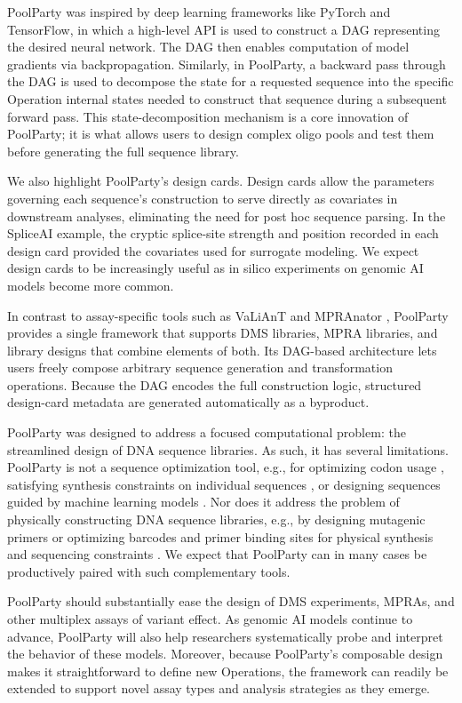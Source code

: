 \documentclass[twoside]{kinneylab_preprintstyle}
\begin{document}
PoolParty was inspired by deep learning frameworks like PyTorch and TensorFlow, in which a high-level API is used to construct a DAG representing the desired neural network. The DAG then enables computation of model gradients via backpropagation. Similarly, in PoolParty, a backward pass through the DAG is used to decompose the state for a requested sequence into the specific Operation internal states needed to construct that sequence during a subsequent forward pass. This state-decomposition mechanism is a core innovation of PoolParty; it is what allows users to design complex oligo pools and test them before generating the full sequence library.

We also highlight PoolParty's design cards. Design cards allow the parameters governing each sequence's construction to serve directly as covariates in downstream analyses, eliminating the need for post hoc sequence parsing. In the SpliceAI example, the cryptic splice-site strength and position recorded in each design card provided the covariates used for surrogate modeling. We expect design cards to be increasingly useful as in silico experiments on genomic AI models become more common.

In contrast to assay-specific tools such as VaLiAnT \citep{Barbon2022th} and MPRAnator \citep{GeorgakopoulosSoares2017gb}, PoolParty provides a single framework that supports DMS libraries, MPRA libraries, and library designs that combine elements of both. Its DAG-based architecture lets users freely compose arbitrary sequence generation and transformation operations. Because the DAG encodes the full construction logic, structured design-card metadata are generated automatically as a byproduct.

PoolParty was designed to address a focused computational problem: the streamlined design of DNA sequence libraries. As such, it has several limitations. PoolParty is not a sequence optimization tool, e.g., for optimizing codon usage \citep{Swainston2017rb}, satisfying synthesis constraints on individual sequences \citep{Zulkower2020jk}, or designing sequences guided by machine learning models \citep{Schreiber2025ledidi}. Nor does it address the problem of physically constructing DNA sequence libraries, e.g., by designing mutagenic primers \citep{Hiraga2021yg} or optimizing barcodes and primer binding sites for physical synthesis and sequencing constraints \citep{Hossain2024oc}. We expect that PoolParty can in many cases be productively paired with such complementary tools.

PoolParty should substantially ease the design of DMS experiments, MPRAs, and other multiplex assays of variant effect. As genomic AI models continue to advance, PoolParty will also help researchers systematically probe and interpret the behavior of these models. Moreover, because PoolParty's composable design makes it straightforward to define new Operations, the framework can readily be extended to support novel assay types and analysis strategies as they emerge.
\end{document}
